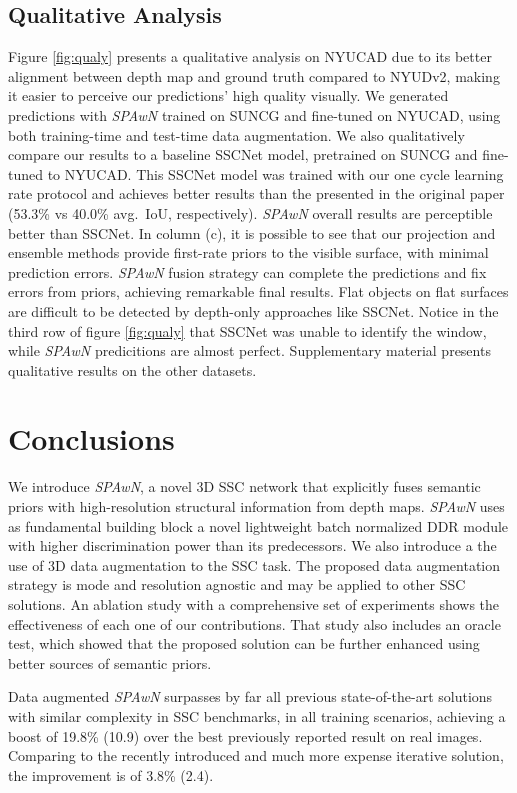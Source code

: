 \subsection{Qualitative Analysis}
Figure \ref{fig:qualy} presents a qualitative analysis on NYUCAD due to its better alignment between depth map and ground truth compared to NYUDv2, making it easier to perceive our predictions' high quality visually. We generated predictions with \emph{SPAwN} trained on SUNCG and fine-tuned on NYUCAD, using both training-time and test-time data augmentation. We also qualitatively compare our results to a baseline SSCNet model, pretrained on SUNCG and fine-tuned to NYUCAD. 
This SSCNet model was trained with our one cycle learning rate protocol and achieves better results than the presented in the original paper \cite{song_semantic_2017} (53.3\% vs 40.0\% avg.\ IoU, respectively).
\emph{SPAwN} overall results are perceptible better than SSCNet. In column (c), it is possible to see that our projection and ensemble methods provide first-rate priors to the visible surface, with minimal prediction errors. \emph{SPAwN} fusion strategy can complete the predictions and fix errors from priors, achieving remarkable final results.
Flat objects on flat surfaces are difficult to be detected by depth-only approaches like SSCNet. Notice in the third row of figure \ref{fig:qualy} that SSCNet was unable to identify the window, while \emph{SPAwN} predicitions are almost perfect.
Supplementary material presents qualitative results on the other datasets.

\section{Conclusions}
\vspace{-.1em}
We introduce \emph{SPAwN}, a novel 3D SSC network that explicitly fuses semantic priors with high-resolution structural information from depth maps.
\emph{SPAwN} uses as fundamental building block a
novel lightweight batch normalized DDR module with higher discrimination power than its predecessors. 
We also introduce a the use of 3D data augmentation to the SSC task. The proposed data augmentation strategy is mode and resolution agnostic and may be applied to other SSC solutions. 
An ablation study with a comprehensive set of experiments shows the effectiveness of each one of our contributions. That study also includes an oracle test, which showed that the proposed solution can be further enhanced using better sources of semantic priors.

Data augmented \emph{SPAwN} surpasses by far all previous state-of-the-art solutions with similar complexity in SSC benchmarks, in all training scenarios, achieving a boost of 19.8\% (\SI{10.9}{\pp}) over the best previously reported result on real images. Comparing to the recently introduced and much more expense iterative solution, the improvement is of 3.8\% (\SI{2.4}{\pp}).

